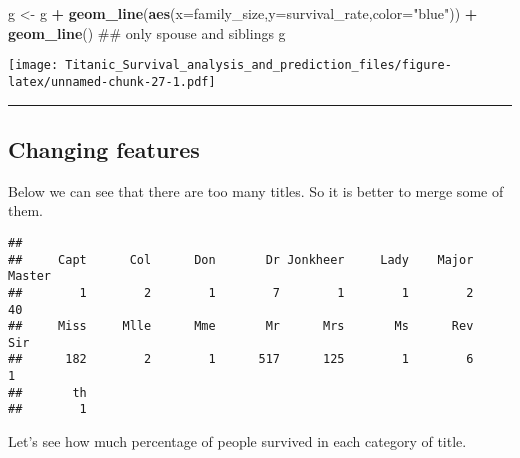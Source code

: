 \documentclass[]{article}
\newenvironment{Shaded}{\begin{snugshade}}{\end{snugshade}}
\newcommand{\KeywordTok}[1]{\textcolor[rgb]{0.13,0.29,0.53}{\textbf{#1}}}
\newcommand{\DataTypeTok}[1]{\textcolor[rgb]{0.13,0.29,0.53}{#1}}
\newcommand{\DecValTok}[1]{\textcolor[rgb]{0.00,0.00,0.81}{#1}}
\newcommand{\StringTok}[1]{\textcolor[rgb]{0.31,0.60,0.02}{#1}}
\newcommand{\OperatorTok}[1]{\textcolor[rgb]{0.81,0.36,0.00}{\textbf{#1}}}
\newcommand{\NormalTok}[1]{#1}
\begin{document}
\begin{Shaded}
\begin{Highlighting}[]
\NormalTok{g <-}\StringTok{ }\NormalTok{g }\OperatorTok{+}\StringTok{ }\KeywordTok{geom_line}\NormalTok{(}\KeywordTok{aes}\NormalTok{(}\DataTypeTok{x=}\NormalTok{family_size,}\DataTypeTok{y=}\NormalTok{survival_rate,}\DataTypeTok{color=}\StringTok{"blue"}\NormalTok{)) }\OperatorTok{+}\StringTok{ }\KeywordTok{geom_line}\NormalTok{() ## only spouse and siblings}
\NormalTok{g}
\end{Highlighting}
\end{Shaded}

\texttt{[image: Titanic\_Survival\_analysis\_and\_prediction\_files/figure-latex/unnamed-chunk-27-1.pdf]}

\begin{center}\rule{0.5\linewidth}{\linethickness}\end{center}

\subsection{Changing features}\label{changing-features}

Below we can see that there are too many titles. So it is better to
merge some of them.

\begin{Shaded}
\end{Shaded}

\begin{verbatim}
## 
##     Capt      Col      Don       Dr Jonkheer     Lady    Major   Master 
##        1        2        1        7        1        1        2       40 
##     Miss     Mlle      Mme       Mr      Mrs       Ms      Rev      Sir 
##      182        2        1      517      125        1        6        1 
##       th 
##        1
\end{verbatim}

Let's see how much percentage of people survived in each category of
title.

\begin{Shaded}
\end{Shaded}
\end{document}
